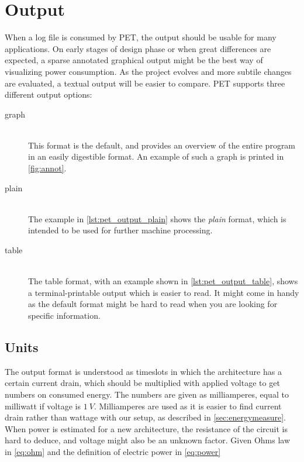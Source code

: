 \section{Output}
\label{sec:output}

When a log file is consumed by PET, the output should be usable for many
applications. On early stages of design phase or when great differences are
expected, a sparse annotated graphical output might be the best way of
visualizing power consumption. As the project evolves and more subtile changes
are evaluated, a textual output will be easier to compare. PET supports three
different output options:

\begin{description}
    \item[graph]\hfill\\
        This format is the default, and provides an overview of
        the entire program in an easily digestible format. An example of such
        a graph is printed in \autoref{fig:annot}.
    \item[plain]\hfill\\
        The example in \autoref{lst:pet_output_plain} shows the \emph{plain}
        format, which is intended to be used for further machine processing.
    \item[table]\hfill\\
        The table format, with an example shown in
        \autoref{lst:pet_output_table}, shows a terminal-printable output which
        is easier to read. It might come in handy as the default format might be
        hard to read when you are looking for specific information.
\end{description}

\subsection{Units}

The output format is understood as timeslots in which the architecture has a
certain current drain, which should be multiplied with applied voltage to get
numbers on consumed energy. The numbers are given as milliamperes, equal to
milliwatt if voltage is $1~V$. Milliamperes are used as it is easier to find
current drain rather than wattage with our setup, as described in
\autoref{sec:energymeasure}. When power is estimated for a new architecture, the
resistance of the circuit is hard to deduce, and voltage might also be an unknown
factor. Given Ohms law in \autoref{eq:ohm} and the definition of electric power
in \autoref{eq:power}

